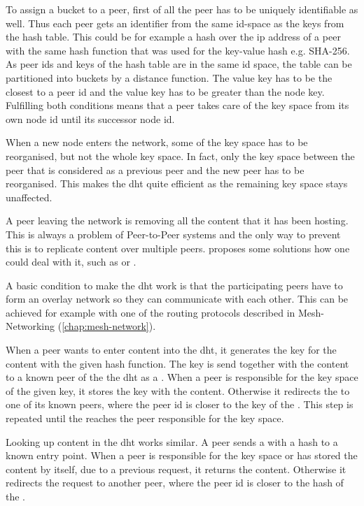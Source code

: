 To assign a bucket to a peer, first of all the peer has to be uniquely identifiable as well. Thus each peer gets an identifier from the same id-space as the keys from the hash table. This could be for example a hash over the \gls{ip} address of a peer with the same hash function that was used for the key-value hash e.g. SHA-256. As peer ids and keys of the hash table are in the same id space, the table can be partitioned into buckets by a distance function. The value key has to be the closest to a peer id and the value key has to be greater than the node key. Fulfilling both conditions means that a peer takes care of the key space from its own node id until its successor node id.

When a new node enters the network, some of the key space has to be reorganised, but not the whole key space. In fact, only the key space between the peer that is considered as a previous peer and the new peer has to be reorganised. This makes the \gls{dht} quite efficient as the remaining key space stays unaffected. 

A peer leaving the network is removing all the content that it has been hosting. This is always a problem of Peer-to-Peer systems and the only way to prevent this is to replicate content over multiple peers. \citet[\S3]{chord} proposes some solutions how one could deal with it, such as  or .

A basic condition to make the \gls{dht} work is that the participating peers have to form an overlay network so they can communicate with each other. This can be achieved for example with one of the routing protocols described in Mesh-Networking (\vref{chap:mesh-network}).

When a peer wants to enter content into the \gls{dht}, it generates the key for the content with the given hash function. The key is send together with the content to a known peer of the the \gls{dht} as a . When a peer is responsible for the key space of the given key, it stores the key with the content. Otherwise it redirects the  to one of its known peers, where the peer id is closer to the key of the . This step is repeated until the  reaches the peer responsible for the key space.

Looking up content in the \gls{dht} works similar. A peer sends a  with a hash to a known entry point. When a peer is responsible for the key space or has stored the content by itself, due to a previous request, it returns the content. Otherwise it redirects the request to another peer, where the peer id is closer to the hash of the .

